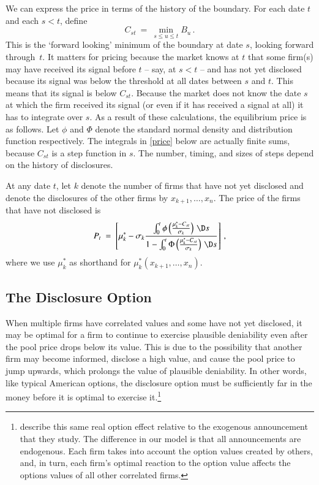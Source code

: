 \documentclass[authoryear,letterpaper,english,12pt]{elsarticle}
\begin{document}
We can express the price in terms of the history of the boundary.  For each date $t$ and each $s<t$, define
$$C_{st} \ = \  \min_{s\le u \le t} B_u\,.$$
This is the `forward looking' minimum of the boundary at date $s$, looking forward through~$t$.  It matters for pricing because the market knows at $t$ that some firm(s) may have received its signal before $t$ -- say, at $s<t$ -- and has not yet disclosed because its signal was below the threshold at all dates between $s$ and $t$.  This means that its signal is below $C_{st}$.  Because the market does not know the date $s$ at which the firm received its signal (or even if it has received a signal at all) it has to integrate over $s$.  As a result of these calculations, the equilibrium price is as follows.  Let $\phi$ and $\Phi$ denote the standard normal density and distribution function respectively.  The integrals in \eqref{price} below are actually finite sums, because $C_{st}$ is a step function in $s$.  The number, timing, and sizes of steps depend on the history of disclosures.  

\begin{proposition}\label{prop:price}
At any date $t$, let $k$ denote the number of firms that have not yet disclosed and denote the disclosures of the other firms by $x_{k+1},\ldots, x_n$.  
The price of the firms that have not disclosed is
\begin{equation}\label{price}
P_t \ = \  \left[\mu^*_k - \sigma_k\frac{\int_0^t \phi\left(\frac{\mu^*_k-C_{st}}{\sigma_k}\right)\,\D s}{1 - \int_0^t \Phi\left(\frac{\mu^*_k-C_{st}}{\sigma_k}\right)\,\D s}\right]\,,
\end{equation}
where we use $\mu^*_k$ as shorthand for $\mu^*_k(x_{k+1},\ldots, x_n)$.  
\end{proposition} 

\subsection{The Disclosure Option}\label{ss:option}

When multiple firms have correlated values and some have not yet disclosed, it may be optimal for a firm to continue to exercise plausible deniability even after the pool price drops below its value. This is due to the possibility that another firm may become informed, disclose a high value, and cause the pool price to jump upwards, which prolongs the value of plausible deniability.  In other words, like typical American options, the disclosure option must be sufficiently far in the money before it is optimal to exercise it.\footnote{\citet*{adk} describe this same real option effect relative to the exogenous announcement that they study.  The difference in our model is that all announcements are endogenous.  Each firm takes into account the option values created by others, and, in turn, each firm's optimal reaction to the option value affects the options values of all other correlated firms.}
\end{document}
